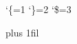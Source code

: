

\catcode`\{=1 %
\catcode`\}=2 %
\catcode`\$=3 %

\hsize=6.5in
\vsize=8.9in
\parindent=20pt

\parfillskip=0pt plus 1fil

\def\qquad{\hskip2em\relax}
\def\supereject{\par\penalty-2000}
\outer\def\bye{\par\vfill\supereject\end}
